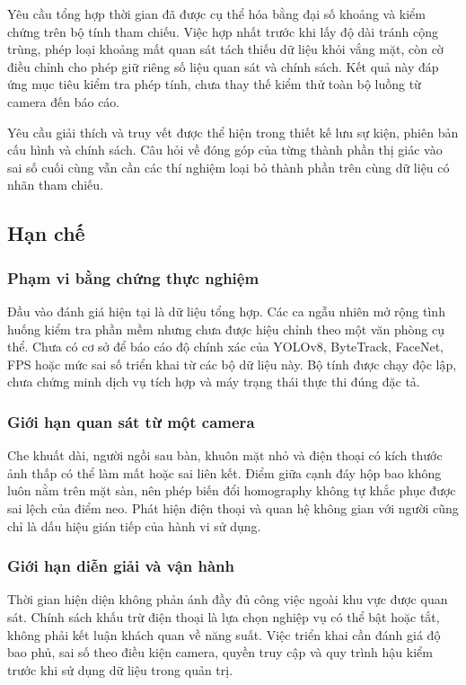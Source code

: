 Yêu cầu tổng hợp thời gian đã được cụ thể hóa bằng đại số khoảng và kiểm chứng trên bộ tính tham chiếu. Việc hợp nhất trước khi lấy độ dài tránh cộng trùng, phép loại khoảng mất quan sát tách thiếu dữ liệu khỏi vắng mặt, còn cờ điều chỉnh cho phép giữ riêng số liệu quan sát và chính sách. Kết quả này đáp ứng mục tiêu kiểm tra phép tính, chưa thay thế kiểm thử toàn bộ luồng từ camera đến báo cáo.

Yêu cầu giải thích và truy vết được thể hiện trong thiết kế lưu sự kiện, phiên bản cấu hình và chính sách. Câu hỏi về đóng góp của từng thành phần thị giác vào sai số cuối cùng vẫn cần các thí nghiệm loại bỏ thành phần trên cùng dữ liệu có nhãn tham chiếu.

\subsection{Hạn chế}
\subsubsection{Phạm vi bằng chứng thực nghiệm}
Đầu vào đánh giá hiện tại là dữ liệu tổng hợp. Các ca ngẫu nhiên mở rộng tình huống kiểm tra phần mềm nhưng chưa được hiệu chỉnh theo một văn phòng cụ thể. Chưa có cơ sở để báo cáo độ chính xác của YOLOv8, ByteTrack, FaceNet, FPS hoặc mức sai số triển khai từ các bộ dữ liệu này. Bộ tính được chạy độc lập, chưa chứng minh dịch vụ tích hợp và máy trạng thái thực thi đúng đặc tả.

\subsubsection{Giới hạn quan sát từ một camera}
Che khuất dài, người ngồi sau bàn, khuôn mặt nhỏ và điện thoại có kích thước ảnh thấp có thể làm mất hoặc sai liên kết. Điểm giữa cạnh đáy hộp bao không luôn nằm trên mặt sàn, nên phép biến đổi homography không tự khắc phục được sai lệch của điểm neo. Phát hiện điện thoại và quan hệ không gian với người cũng chỉ là dấu hiệu gián tiếp của hành vi sử dụng.

\subsubsection{Giới hạn diễn giải và vận hành}
Thời gian hiện diện không phản ánh đầy đủ công việc ngoài khu vực được quan sát. Chính sách khấu trừ điện thoại là lựa chọn nghiệp vụ có thể bật hoặc tắt, không phải kết luận khách quan về năng suất. Việc triển khai cần đánh giá độ bao phủ, sai số theo điều kiện camera, quyền truy cập và quy trình hậu kiểm trước khi sử dụng dữ liệu trong quản trị.

